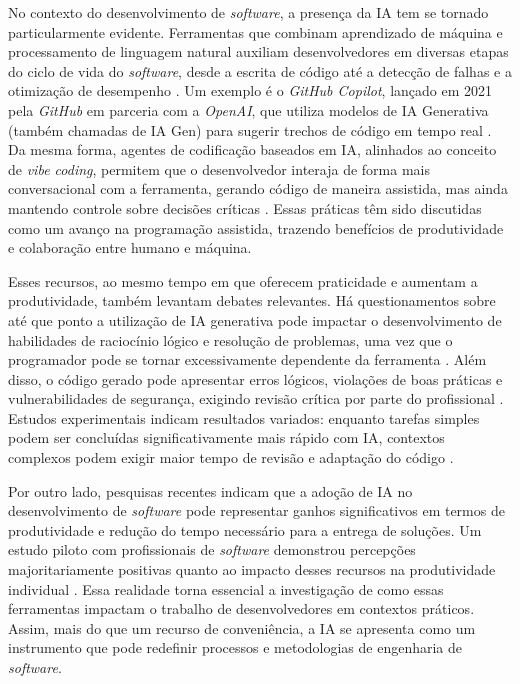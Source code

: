 \documentclass[english,brazilian]{UNISINOSartigo} %
\begin{document}
No contexto do desenvolvimento de \textit{software}, a presença da IA tem se tornado particularmente evidente. Ferramentas que combinam aprendizado de máquina e processamento de linguagem natural auxiliam desenvolvedores em diversas etapas do ciclo de vida do \textit{software}, desde a escrita de código até a detecção de falhas e a otimização de desempenho \cite{coutinho2024}. Um exemplo é o \textit{GitHub Copilot}, lançado em 2021 pela \textit{GitHub} em parceria com a \textit{OpenAI}, que utiliza modelos de IA Generativa (também chamadas de IA Gen) para sugerir trechos de código em tempo real \cite{github2021}. Da mesma forma, agentes de codificação baseados em IA, alinhados ao conceito de \textit{vibe coding}, permitem que o desenvolvedor interaja de forma mais conversacional com a ferramenta, gerando código de maneira assistida, mas ainda mantendo controle sobre decisões críticas \cite{delaney2025}. Essas práticas têm sido discutidas como um avanço na programação assistida, trazendo benefícios de produtividade e colaboração entre humano e máquina.

Esses recursos, ao mesmo tempo em que oferecem praticidade e aumentam a produtividade, também levantam debates relevantes. Há questionamentos sobre até que ponto a utilização de IA generativa pode impactar o desenvolvimento de habilidades de raciocínio lógico e resolução de problemas, uma vez que o programador pode se tornar excessivamente dependente da ferramenta \cite{verastegui2025}. Além disso, o código gerado pode apresentar erros lógicos, violações de boas práticas e vulnerabilidades de segurança, exigindo revisão crítica por parte do profissional \cite{idrisov2024, tosi2024}. Estudos experimentais indicam resultados variados: enquanto tarefas simples podem ser concluídas significativamente mais rápido com IA, contextos complexos podem exigir maior tempo de revisão e adaptação do código \cite{peng2023, exame2025}.

Por outro lado, pesquisas recentes indicam que a adoção de IA no desenvolvimento de \textit{software} pode representar ganhos significativos em termos de produtividade e redução do tempo necessário para a entrega de soluções. Um estudo piloto com profissionais de \textit{software} demonstrou percepções majoritariamente positivas quanto ao impacto desses recursos na produtividade individual \cite{coutinho2024}. Essa realidade torna essencial a investigação de como essas ferramentas impactam o trabalho de desenvolvedores em contextos práticos. Assim, mais do que um recurso de conveniência, a IA se apresenta como um instrumento que pode redefinir processos e metodologias de engenharia de \textit{software}.
\end{document}
